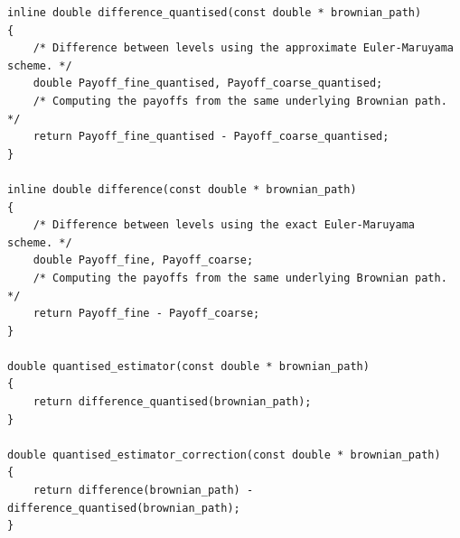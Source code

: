\documentclass[11pt,a4paper,twoside,english]{extarticle}
\begin{document}
\begin{lstfloat}[t]
\begin{lstlisting}[style=C, captionpos=b, caption={[Compiler and hardware optimisation of inlined quantised multilevel Monte Carlo]Compiler and hardware optimisation of inlined quantised multilevel Monte Carlo.}, label={code:c:compiler_optimisation_of_qmlmc}]
inline double difference_quantised(const double * brownian_path)
{
    /* Difference between levels using the approximate Euler-Maruyama scheme. */
    double Payoff_fine_quantised, Payoff_coarse_quantised;
    /* Computing the payoffs from the same underlying Brownian path. */
    return Payoff_fine_quantised - Payoff_coarse_quantised;
}

inline double difference(const double * brownian_path)
{
    /* Difference between levels using the exact Euler-Maruyama scheme. */
    double Payoff_fine, Payoff_coarse;
    /* Computing the payoffs from the same underlying Brownian path. */
    return Payoff_fine - Payoff_coarse;
}

double quantised_estimator(const double * brownian_path)
{
    return difference_quantised(brownian_path);
}

double quantised_estimator_correction(const double * brownian_path)
{
    return difference(brownian_path) - difference_quantised(brownian_path);    
}
\end{lstlisting}
\end{lstfloat}
\end{document}
